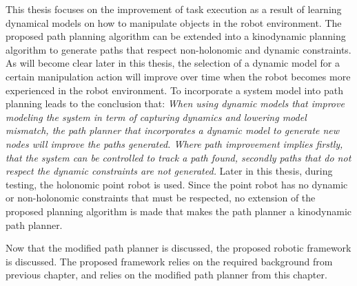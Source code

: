 This thesis focuses on the improvement of task execution as a result of learning dynamical models on how to manipulate objects in the robot environment. The proposed path planning algorithm can be extended into a kinodynamic planning algorithm to generate paths that respect non-holonomic and dynamic constraints. As will become clear later in this thesis, the selection of a dynamic model for a certain manipulation action will improve over time when the robot becomes more experienced in the robot environment. To incorporate a system model into path planning leads to the conclusion that: \textit{When using dynamic models that improve modeling the system in term of capturing dynamics and lowering model mismatch, the path planner that incorporates a dynamic model to generate new nodes will improve the paths generated. Where path improvement implies firstly, that the system can be controlled to track a path found, secondly paths that do not respect the dynamic constraints are not generated.} Later in this thesis, during testing, the holonomic point robot is used. Since the point robot has no dynamic or non-holonomic constraints that must be respected, no extension of the proposed planning algorithm is made that makes the path planner a kinodynamic path planner.\bs

Now that the modified path planner is discussed, the proposed robotic framework is discussed. The proposed framework relies on the required background from previous chapter, and relies on the modified path planner from this chapter.\bs




